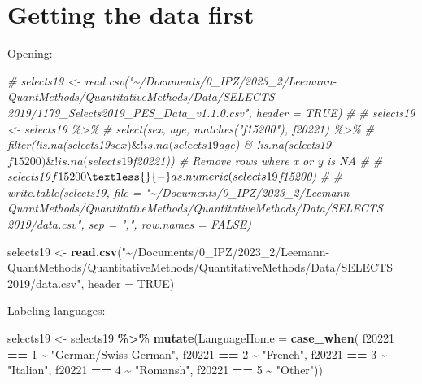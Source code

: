 \documentclass[
]{book}
\newenvironment{Shaded}{\begin{snugshade}}{\end{snugshade}}
\newcommand{\AttributeTok}[1]{\textcolor[rgb]{0.13,0.29,0.53}{#1}}
\newcommand{\CommentTok}[1]{\textcolor[rgb]{0.56,0.35,0.01}{\textit{#1}}}
\newcommand{\ConstantTok}[1]{\textcolor[rgb]{0.56,0.35,0.01}{#1}}
\newcommand{\DecValTok}[1]{\textcolor[rgb]{0.00,0.00,0.81}{#1}}
\newcommand{\FunctionTok}[1]{\textcolor[rgb]{0.13,0.29,0.53}{\textbf{#1}}}
\newcommand{\NormalTok}[1]{#1}
\newcommand{\OtherTok}[1]{\textcolor[rgb]{0.56,0.35,0.01}{#1}}
\newcommand{\SpecialCharTok}[1]{\textcolor[rgb]{0.81,0.36,0.00}{\textbf{#1}}}
\newcommand{\StringTok}[1]{\textcolor[rgb]{0.31,0.60,0.02}{#1}}
\begin{document}
\hypertarget{getting-the-data-first-1}{%
\section{Getting the data first}\label{getting-the-data-first-1}}

Opening:

\begin{Shaded}
\begin{Highlighting}[]
\CommentTok{\# selects19 \textless{}{-} read.csv("\textasciitilde{}/Documents/0\_IPZ/2023\_2/Leemann{-}QuantMethods/QuantitativeMethods/Data/SELECTS 2019/1179\_Selects2019\_PES\_Data\_v1.1.0.csv", header = TRUE)}
\CommentTok{\# }
\CommentTok{\# selects19 \textless{}{-} selects19 \%\textgreater{}\%}
\CommentTok{\#   select(sex, age, matches("f15200"), f20221) \%\textgreater{}\%}
\CommentTok{\#   filter(!is.na(selects19$sex) \& !is.na(selects19$age) \& !is.na(selects19$f15200) \& !is.na(selects19$f20221))  \# Remove rows where x or y is NA}
\CommentTok{\# }
\CommentTok{\# selects19$f15200 \textless{}{-} as.numeric(selects19$f15200)}
\CommentTok{\# }
\CommentTok{\# write.table(selects19, file = "\textasciitilde{}/Documents/0\_IPZ/2023\_2/Leemann{-}QuantMethods/QuantitativeMethods/QuantitativeMethods/Data/SELECTS 2019/data.csv", sep = ",", row.names = FALSE)}

\NormalTok{selects19 }\OtherTok{\textless{}{-}} \FunctionTok{read.csv}\NormalTok{(}\StringTok{"\textasciitilde{}/Documents/0\_IPZ/2023\_2/Leemann{-}QuantMethods/QuantitativeMethods/QuantitativeMethods/Data/SELECTS 2019/data.csv"}\NormalTok{, }\AttributeTok{header =} \ConstantTok{TRUE}\NormalTok{)}
\end{Highlighting}
\end{Shaded}

Labeling languages:

\begin{Shaded}
\begin{Highlighting}[]
\NormalTok{selects19 }\OtherTok{\textless{}{-}}\NormalTok{ selects19 }\SpecialCharTok{\%\textgreater{}\%}
  \FunctionTok{mutate}\NormalTok{(}\AttributeTok{LanguageHome =} \FunctionTok{case\_when}\NormalTok{(}
\NormalTok{    f20221 }\SpecialCharTok{==} \DecValTok{1} \SpecialCharTok{\textasciitilde{}} \StringTok{"German/Swiss German"}\NormalTok{,}
\NormalTok{    f20221 }\SpecialCharTok{==} \DecValTok{2} \SpecialCharTok{\textasciitilde{}} \StringTok{"French"}\NormalTok{,}
\NormalTok{    f20221 }\SpecialCharTok{==} \DecValTok{3} \SpecialCharTok{\textasciitilde{}} \StringTok{"Italian"}\NormalTok{,}
\NormalTok{    f20221 }\SpecialCharTok{==} \DecValTok{4} \SpecialCharTok{\textasciitilde{}} \StringTok{"Romansh"}\NormalTok{,}
\NormalTok{    f20221 }\SpecialCharTok{==} \DecValTok{5} \SpecialCharTok{\textasciitilde{}} \StringTok{"Other"}\NormalTok{))}
\end{Highlighting}
\end{Shaded}
\end{document}
